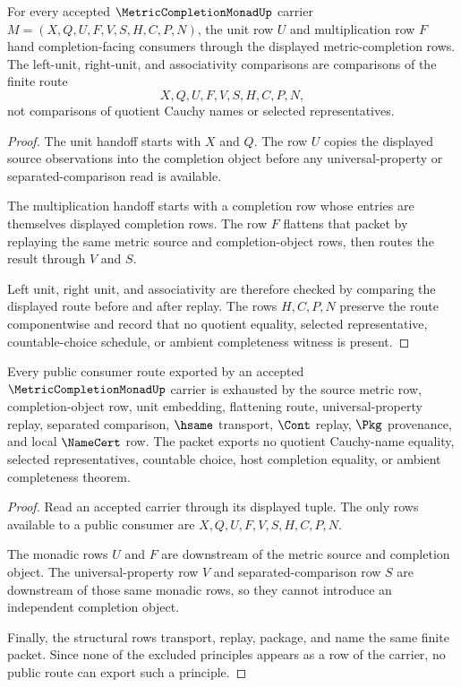 \begin{theorem}
\label{thm:metric-completion-monad-unit-multiplication}
For every accepted $\MetricCompletionMonadUp$ carrier $M=(X,Q,U,F,V,S,H,C,P,N)$, the unit row $U$ and multiplication row $F$ hand completion-facing consumers through the displayed metric-completion rows. The left-unit, right-unit, and associativity comparisons are comparisons of the finite route
$$
X,Q,U,F,V,S,H,C,P,N ,
$$
not comparisons of quotient Cauchy names or selected representatives.
\end{theorem}
\begin{proof}
The unit handoff starts with $X$ and $Q$. The row $U$ copies the displayed source observations into the completion object before any universal-property or separated-comparison read is available.

The multiplication handoff starts with a completion row whose entries are themselves displayed completion rows. The row $F$ flattens that packet by replaying the same metric source and completion-object rows, then routes the result through $V$ and $S$.

Left unit, right unit, and associativity are therefore checked by comparing the displayed route before and after replay. The rows $H,C,P,N$ preserve the route componentwise and record that no quotient equality, selected representative, countable-choice schedule, or ambient completeness witness is present.
\end{proof}

\begin{theorem}
\label{thm:metric-completion-monad-nonescape}
Every public consumer route exported by an accepted $\MetricCompletionMonadUp$ carrier is exhausted by the source metric row, completion-object row, unit embedding, flattening route, universal-property replay, separated comparison, $\hsame$ transport, $\Cont$ replay, $\Pkg$ provenance, and local $\NameCert$ row. The packet exports no quotient Cauchy-name equality, selected representatives, countable choice, host completion equality, or ambient completeness theorem.
\end{theorem}
\begin{proof}
Read an accepted carrier through its displayed tuple. The only rows available to a public consumer are $X,Q,U,F,V,S,H,C,P,N$.

The monadic rows $U$ and $F$ are downstream of the metric source and completion object. The universal-property row $V$ and separated-comparison row $S$ are downstream of those same monadic rows, so they cannot introduce an independent completion object.

Finally, the structural rows transport, replay, package, and name the same finite packet. Since none of the excluded principles appears as a row of the carrier, no public route can export such a principle.
\end{proof}

